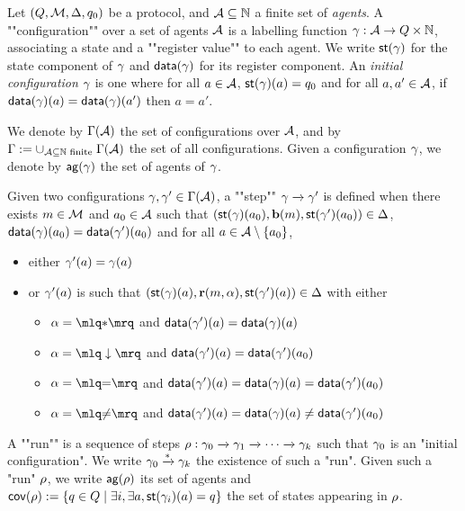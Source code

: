 \begin{definition}
	Let $(Q,\mathcal{M}, \Delta, q_0)$ be a protocol, and $\mathcal{A} \subseteq \mathbb{N}$ a finite set of \emph{agents}.
	A ""configuration"" over a set of agents $\mathcal{A}$ is a labelling function $\gamma : \mathcal{A} \to Q \times \mathbb{N}$, associating a state and a ""register value"" to each agent. We write $\mathsf{st}(\gamma)$ for the state component of $\gamma$ and $\mathsf{data}(\gamma)$ for its register component. 
	An \emph{initial configuration} $\gamma$ is one where for all $a \in \mathcal{A}$, $\mathsf{st}(\gamma)(a) = q_0$ and for all $a, a' \in \mathcal{A}$, if $\mathsf{data}(\gamma)(a) = \mathsf{data}(\gamma)(a')$ then $a=a'$.
	
	\AP We denote by $\Gamma(\mathcal{A})$ the set of configurations over $\mathcal{A}$, and by $\Gamma := \cup_{\mathcal{A} \subseteq \mathbb{N} \text{ finite }} \Gamma(\mathcal{A})$ the set of all configurations. Given a configuration $\gamma$, we denote by $\mathsf{ag}(\gamma)$ the set of agents of $\gamma$.

	\AP Given two configurations $\gamma, \gamma' \in \Gamma(\mathcal{A})$, a ""step"" $\gamma \xrightarrow{} \gamma'$ is defined when there exists $m \in \mathcal{M}$ and $a_0 \in \mathcal{A}$ such that $(\mathsf{st}(\gamma)(a_0),\textbf{b}(m), \mathsf{st}(\gamma')(a_0)) \in \Delta$, $\mathsf{data}(\gamma)(a_0) = \mathsf{data}(\gamma')(a_0)$ and for all $a \in \mathcal{A}\setminus \{a_0\}$,  
	\begin{itemize}
		\item either $\gamma'(a) = \gamma(a)$
		
		\item or $\gamma'(a)$ is such that $(\mathsf{st}(\gamma)(a), \textbf{r}(m, \alpha), \mathsf{st}(\gamma')(a)) \in \Delta$ with either
		\begin{itemize}
			\item $\anact = \quotemarks{\dummyact}$ 
			and $\mathsf{data}(\gamma')(a) = \mathsf{data}(\gamma)(a)$
			\item $\anact = \quotemarks{\enregact}$ and $\mathsf{data}(\gamma')(a) = \mathsf{data}(\gamma')(a_0)$
			\item $\anact = \quotemarks{\eqtestact}$ and $\mathsf{data}(\gamma')(a) = \mathsf{data}(\gamma)(a) =\mathsf{data}(\gamma')(a_0)$
			\item $\anact = \quotemarks{\diseqtestact}$ and $\mathsf{data}(\gamma')(a) = \mathsf{data}(\gamma)(a) \ne \mathsf{data}(\gamma')(a_0)$
		\end{itemize}
	\end{itemize}

	\AP A ""run"" is a sequence of steps $\rho : \gamma_0 \xrightarrow{} \gamma_1 \xrightarrow{} \cdots \xrightarrow{} \gamma_k$ such that $\gamma_0$ is an "initial configuration". We write $\gamma_0 \xrightarrow{*} \gamma_k$ the existence of such a "run". Given such a "run" $\rho$, we write $\mathsf{ag}(\rho)$ its set of agents and $\mathsf{cov}(\rho):= \{q \in Q \mid \exists i, \exists a, \mathsf{st}(\gamma_i)(a) = q\}$ the set of states appearing in $\rho$.  

\end{definition}

